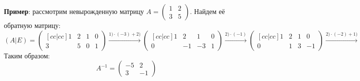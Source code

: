 \documentclass[12pt]{article}
\theoremstyle{definition}
\begin{document}
\textbf{Пример}: рассмотрим невырожденную матрицу $A = 
\begin{pmatrix}
	1 & 2 \\
	3 & 5
\end{pmatrix}$. Найдем её обратную матрицу:
$$
	(A|E) = 
	\begin{pmatrix}[cc|cc]
		1 & 2 & 1 & 0 \\
		3 & 5 & 0 & 1
	\end{pmatrix} \xrightarrow{1){\cdot}(-3) + 2)} 
	\begin{pmatrix}[cc|cc]
		1 & 2 & 1 & 0 \\
		0 & -1 & -3 & 1
	\end{pmatrix}
	\xrightarrow{2){\cdot}(-1)} 
	\begin{pmatrix}[cc|cc]
		1 & 2 & 1 & 0 \\
		0 & 1 & 3 & -1
	\end{pmatrix}\xrightarrow{2){\cdot}(-2) + 1)} 
	\begin{pmatrix}[cc|cc]
		1 & 0 & -5 & 2 \\
		0 & 1 & 3 & -1
	\end{pmatrix}
$$
Таким образом:
$$
	A^{-1} = 
	\begin{pmatrix}
		-5 & 2 \\
		3 & -1
	\end{pmatrix}
$$
\end{document}
